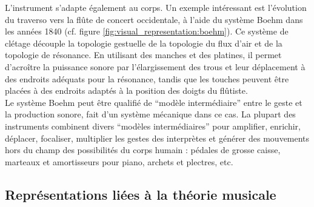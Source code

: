 
\noindent L'instrument s'adapte également au corps. Un exemple intéressant est l'évolution du traverso vers la flûte de concert occidentale, à l'aide du système Boehm dans les années 1840 (cf. figure \ref{fig:visual_representation:boehm}). Ce système de clétage découple la topologie gestuelle de la topologie du flux d'air et de la topologie de résonance. En utilisant des manches et des platines, il permet d'acroître la puissance sonore par l'élargissement des trous et leur déplacement à des endroits adéquats pour la résonance, tandis que les touches peuvent être placées à des endroits adaptés à la position des doigts du flûtiste.\\
\indent Le système Boehm peut être qualifié de ``modèle intermédiaire'' entre le geste et la production sonore, fait d'un système mécanique dans ce cas. La plupart des instruments combinent divers ``modèles intermédiaires'' pour amplifier, enrichir, déplacer, focaliser, multiplier les gestes des interprètes et générer des mouvements hors du champ des possibilités du corps humain : pédales de grosse caisse, marteaux et amortisseurs pour piano, archets et plectres, etc.

\subsection{Représentations liées à la théorie musicale}

